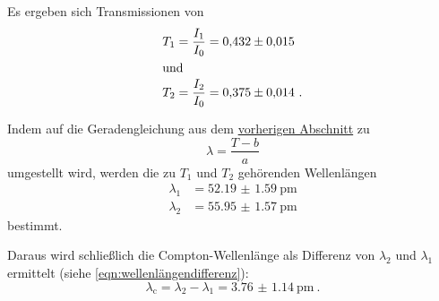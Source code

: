 Es ergeben sich Transmissionen von
\begin{align*}
  T_1 &= \frac{I_1}{I_0} = \num{0.432(15)} \\
\intertext{und}
  T_2 &= \frac{I_2}{I_0} = \num{0.375(14)} \ .
\end{align*}

Indem auf die Geradengleichung aus dem \hyperref[sec:auswertung:transmission]{vorherigen Abschnitt} zu
\[ \lambda = \frac{T-b}{a} \]
umgestellt wird,
werden die zu $T_1$ und $T_2$ gehörenden Wellenlängen
\begin{align*}
  \lambda_1 &= \SI{52.19(159)}{\pico\meter} \\
  \lambda_2 &= \SI{55.95(157)}{\pico\meter}
\end{align*}
bestimmt.

Daraus wird schließlich die Compton-Wellenlänge als Differenz von $\lambda_2$ und $\lambda_1$ ermittelt
(siehe \autoref{eqn:wellenlängendifferenz}):
\[ \lambda_\text{c} = \lambda_2 - \lambda_1 = \SI{3.76(114)}{\pico\meter} \ . \]
